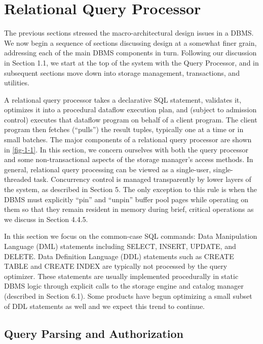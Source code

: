 \documentclass[a4paper,11pt,twoside,openright]{book}
\begin{document}
\hypertarget{relational-query-processor}{%
\chapter{Relational Query Processor}\label{relational-query-processor}}

The previous sections stressed the macro-architectural design issues in
a DBMS. We now begin a sequence of sections discussing design at a
somewhat finer grain, addressing each of the main DBMS components in
turn. Following our discussion in Section 1.1, we start at the top of
the system with the Query Processor, and in subsequent sections move
down into storage management, transactions, and utilities.

A relational query processor takes a declarative SQL statement,
validates it, optimizes it into a procedural dataflow execution plan,
and (subject to admission control) executes that dataflow program on
behalf of a client program. The client program then fetches (``pulls'')
the result tuples, typically one at a time or in small batches. The
major components of a relational query processor are shown in \autoref{fig-1-1}.
In this section, we concern ourselves with both the query processor
and some non-transactional aspects of the storage manager's access
methods. In general, relational query processing can be viewed as a
single-user, single-threaded task. Concurrency control is managed
transparently by lower layers of the system, as described in Section 5.
The only exception to this rule is when the DBMS must explicitly ``pin''
and ``unpin'' buffer pool pages while operating on them so that
they remain resident in memory during brief, critical operations as we
discuss in Section 4.4.5.

In this section we focus on the common-case SQL commands: Data
Manipulation Language (DML) statements including SELECT, INSERT, UPDATE,
and DELETE. Data Definition Language (DDL) statements such as CREATE
TABLE and CREATE INDEX are typically not processed by the query
optimizer. These statements are usually implemented procedurally in
static DBMS logic through explicit calls to the storage engine and
catalog manager (described in Section 6.1). Some products have begun
optimizing a small subset of DDL statements as well and we expect this
trend to continue.

\hypertarget{query-parsing-and-authorization}{%
\section{Query Parsing and
Authorization}\label{query-parsing-and-authorization}}
\end{document}

